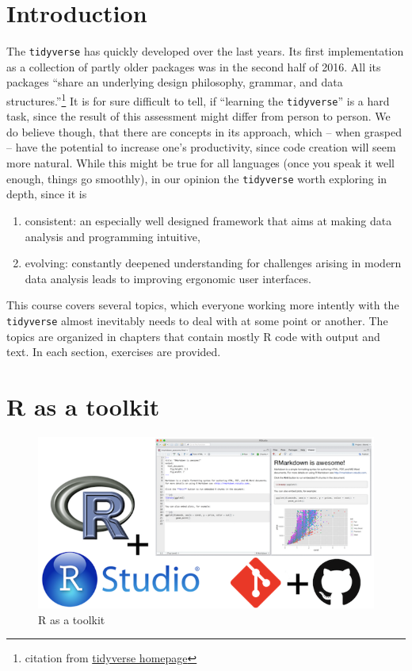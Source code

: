 \documentclass[]{book}
\providecommand{\tightlist}{%
  \setlength{\itemsep}{0pt}\setlength{\parskip}{0pt}}
\let\rmarkdownfootnote\footnote%
\def\footnote{\protect\rmarkdownfootnote}
\begin{document}
\hypertarget{introduction}{%
\section{Introduction}\label{introduction}}

The \texttt{tidyverse} has quickly developed over the last years.
Its first implementation as a collection of partly older packages was in the second half of 2016.
All its packages ``share an underlying design philosophy, grammar, and data structures.''\footnote{citation from \href{https://www.tidyverse.org/}{tidyverse homepage}}
It is for sure difficult to tell, if ``learning the \texttt{tidyverse}'' is a hard task, since the result of this assessment might differ from person to person.
We do believe though, that there are concepts in its approach, which -- when grasped -- have the potential to increase one's productivity, since code creation will seem more natural.
While this might be true for all languages (once you speak it well enough, things go smoothly), in our opinion the \texttt{tidyverse} worth exploring in depth, since it is

\begin{enumerate}
\def\labelenumi{\arabic{enumi}.}
\tightlist
\item
  consistent: an especially well designed framework that aims at making data analysis and programming intuitive,
\item
  evolving: constantly deepened understanding for challenges arising in modern data analysis leads to improving ergonomic user interfaces.
\end{enumerate}

This course covers several topics, which everyone working more intently with the \texttt{tidyverse} almost inevitably needs to deal with at some point or another.
The topics are organized in chapters that contain mostly R code with output and text.
In each section, exercises are provided.

\hypertarget{r-as-a-toolkit}{%
\section{R as a toolkit}\label{r-as-a-toolkit}}

\begin{figure}
\centering
\includegraphics{img/toolkit.png}
\caption{R as a toolkit}
\end{figure}
\end{document}
